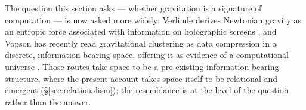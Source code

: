 %
%
%

The question this section asks --- whether gravitation is a signature of computation --- is now
asked more widely: Verlinde derives Newtonian gravity as an entropic force associated with
information on holographic screens \autocite{verlinde2011origin}, and Vopson has recently read
gravitational clustering as data compression in a discrete, information-bearing space, offering it
as evidence of a computational universe \autocite{vopson2025gravity}. Those routes take space to be
a pre-existing information-bearing structure, where the present account takes space itself to be
relational and emergent (\S\ref{sec:relationalism}); the resemblance is at the level of the
question rather than the answer.
